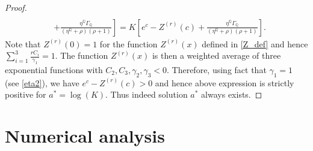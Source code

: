 \documentclass[10pt,a4paper]{amsart}
\def\Q{{\mathbb{Q}}}
\begin{document}
\begin{proof}
\begin{align*}
				\\ \nonumber &+ \left. \frac{\eta^\Q\Gamma_\Q}{(\eta^\Q+\rho)(\rho+1)} \right] = K\left[ e^c - Z^{(r)}(c) + \frac{\eta^\Q\Gamma_\Q}{(\eta^\Q+\rho)(\rho+1)} \right].
			\end{align*}
			Note that $Z^{(r)}(0) = 1$ for the function $Z^{(r)}(x)$ defined in \eqref{Z_def} and hence
			$\sum_{i=1}^{3} \frac{rC_i}{\gamma_1} = 1$. The function $Z^{(r)}(x)$ is then a weighted average of three exponential functions with $C_2, C_3, \gamma_2, \gamma_3 < 0$. Therefore, using fact that $\gamma_1=1$ (see \eqref{eta2}),
			we have $ e^c - Z^{(r)}(c) > 0$ and hence above expression is strictly positive for $a^* = \log(K)$. Thus indeed solution $a^*$ always exists.
		\end{proof}

		\section{Numerical analysis}\label{sec:num}
\end{document}
